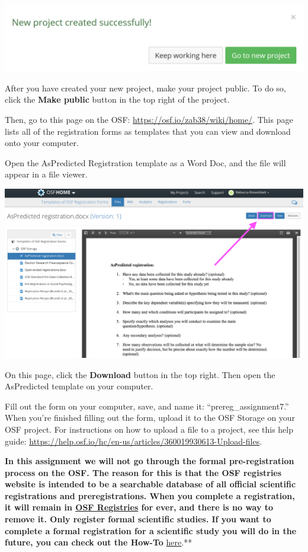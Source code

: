 \documentclass[
  oneside]{krantz}
\begin{document}
\begin{center}\includegraphics[width=1\linewidth]{images/34c3f0068911af6749513b1584c4cac7} \end{center}

After you have created your new project, make your project public. To do so,
click the \textbf{Make public} button in the top right of the project.

Then, go to this page on the OSF: \url{https://osf.io/zab38/wiki/home/}. This page
lists all of the registration forms as templates that you can view and download
onto your computer.

Open the AsPredicted Registration template as a Word Doc, and the file will
appear in a file viewer.

\begin{center}\includegraphics[width=1\linewidth]{images/895c7caf7508910ae52cc2d09e06f31c} \end{center}

On this page, click the \textbf{Download} button in the top right. Then open the
AsPredicted template on your computer.

Fill out the form on your computer, save, and name it: ``prereg\_assignment7.''
When you're finished filling out the form, upload it to the OSF Storage on your
OSF project. For instructions on how to upload a file to a project, see this
help guide: \url{https://help.osf.io/hc/en-us/articles/360019930613-Upload-files}.

\textbf{In this assignment we will not go through the formal pre-registration process on the OSF. The reason for this is that the OSF registries website is intended to be a searchable database of all official scientific registrations and preregistrations. When you complete a registration, it will remain in \href{https://osf.io/registries/}{OSF Registries} for ever, and there is no way to remove it. Only register formal scientific studies. If you want to complete a formal registration for a scientific study you will do in the future, you can check out the How-To} \href{https://help.osf.io/article/158-create-a-preregistration}{here}.**
\end{document}
